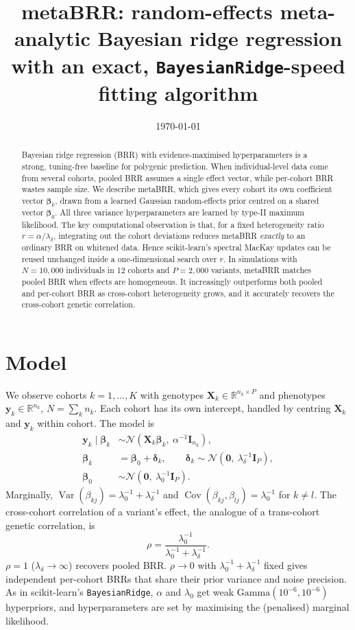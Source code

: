 \documentclass[11pt]{article}
\title{metaBRR: random-effects meta-analytic Bayesian ridge regression\\
\large with an exact, \texttt{BayesianRidge}-speed fitting algorithm}
\author{}
\date{\today}
\newcommand{\bb}{\bm\beta}
\newcommand{\bd}{\bm\delta}
\newcommand{\by}{\mathbf y}
\newcommand{\bX}{\mathbf X}
\newcommand{\bI}{\mathbf I}
\newcommand{\N}{\mathcal N}
\begin{document}
\maketitle

\begin{abstract}
Bayesian ridge regression (BRR) with evidence-maximised hyperparameters is a strong,
tuning-free baseline for polygenic prediction. When individual-level data come from
several cohorts, pooled BRR assumes a single effect vector, while per-cohort BRR wastes
sample size. We describe metaBRR, which gives every cohort its own coefficient vector
$\bb_k$, drawn from a learned Gaussian random-effects prior centred on a shared vector
$\bb_0$. All three variance hyperparameters are learned by type-II maximum likelihood.
The key computational observation is that, for a fixed heterogeneity ratio
$r=\alpha/\lambda_\delta$, integrating out the cohort deviations reduces metaBRR
\emph{exactly} to an ordinary BRR on whitened data. Hence scikit-learn's spectral MacKay
updates can be reused unchanged inside a one-dimensional search over $r$. In simulations
with $N=10{,}000$ individuals in 12 cohorts and $P=2{,}000$ variants, metaBRR matches
pooled BRR when effects are homogeneous. It increasingly outperforms both pooled and
per-cohort BRR as cross-cohort heterogeneity grows, and it accurately recovers the
cross-cohort genetic correlation.
\end{abstract}

\section{Model}
We observe cohorts $k=1,\dots,K$ with genotypes $\bX_k\in\mathbb R^{n_k\times P}$ and
phenotypes $\by_k\in\mathbb R^{n_k}$, $N=\sum_k n_k$. Each cohort has its own intercept,
handled by centring $\bX_k$ and $\by_k$ within cohort. The model is
\begin{align}
\by_k \mid \bb_k &\sim \N(\bX_k\bb_k,\ \alpha^{-1}\bI_{n_k}), \\
\bb_k &= \bb_0 + \bd_k, \qquad \bd_k \sim \N(\mathbf 0,\ \lambda_\delta^{-1}\bI_P), \\
\bb_0 &\sim \N(\mathbf 0,\ \lambda_0^{-1}\bI_P).
\end{align}
Marginally, $\operatorname{Var}(\beta_{kj})=\lambda_0^{-1}+\lambda_\delta^{-1}$ and
$\operatorname{Cov}(\beta_{kj},\beta_{lj})=\lambda_0^{-1}$ for $k\neq l$. The
cross-cohort correlation of a variant's effect, the analogue of a trans-cohort genetic
correlation, is
\begin{equation}
\rho = \frac{\lambda_0^{-1}}{\lambda_0^{-1}+\lambda_\delta^{-1}}.
\end{equation}
$\rho=1$ ($\lambda_\delta\to\infty$) recovers pooled BRR. $\rho\to 0$ with
$\lambda_0^{-1}+\lambda_\delta^{-1}$ fixed gives independent per-cohort BRRs that share
their prior variance and noise precision. As in scikit-learn's \texttt{BayesianRidge},
$\alpha$ and $\lambda_0$ get weak $\mathrm{Gamma}(10^{-6},10^{-6})$ hyperpriors, and
hyperparameters are set by maximising the (penalised) marginal likelihood.
\end{document}
